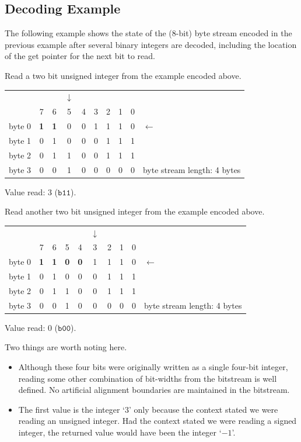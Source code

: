 \documentclass[11pt,letterpaper]{book}
\newcommand{\bin}[1]{\ensuremath{\mathtt{b#1}}}
\numberwithin{equation}{chapter}
\numberwithin{figure}{chapter}
\numberwithin{table}{chapter}
\begin{document}
\subsection{Decoding Example}

The following example shows the state of the (8-bit) byte stream encoded in the
 previous example after several binary integers are decoded, including the
 location of the get pointer for the next bit to read.

Read a two bit unsigned integer from the example encoded above.

\begin{tabular}{r|ccccccccl}
\multicolumn{1}{r}{} &&&$\downarrow$&&&&&&              \\
         & 7 & 6 & 5 & 4 & 3 & 2 & 1 & 0 &              \\\cline{1-9}
byte 0   & \textbf{1} & \textbf{1} & 0 & 0 & 1 & 1 & 1 & 0 & $\leftarrow$ \\
byte 1   & 0 & 1 & 0 & 0 & 0 & 1 & 1 & 1 &              \\
byte 2   & 0 & 1 & 1 & 0 & 0 & 1 & 1 & 1 &              \\
byte 3   & 0 & 0 & 1 & 0 & 0 & 0 & 0 & 0 &
byte stream length: 4 bytes
\end{tabular}
\vspace{\baselineskip}

Value read: 3 (\bin{11}).

Read another two bit unsigned integer from the example encoded above.

\begin{tabular}{r|ccccccccl}
\multicolumn{1}{r}{} &&&&&$\downarrow$&&&&              \\
         & 7 & 6 & 5 & 4 & 3 & 2 & 1 & 0 &              \\\cline{1-9}
byte 0   & \textbf{1} & \textbf{1} & \textbf{0} & \textbf{0} &
                           1 & 1 & 1 & 0 & $\leftarrow$ \\
byte 1   & 0 & 1 & 0 & 0 & 0 & 1 & 1 & 1 &              \\
byte 2   & 0 & 1 & 1 & 0 & 0 & 1 & 1 & 1 &              \\
byte 3   & 0 & 0 & 1 & 0 & 0 & 0 & 0 & 0 &
byte stream length: 4 bytes
\end{tabular}
\vspace{\baselineskip}

Value read: 0 (\bin{00}).

Two things are worth noting here.
\begin{itemize}
\item
Although these four bits were originally written as a single four-bit integer,
 reading some other combination of bit-widths from the bitstream is well
 defined.
No artificial alignment boundaries are maintained in the bitstream.
\item
The first value is the integer `$3$' only because the context stated we were
 reading an unsigned integer.
Had the context stated we were reading a signed integer, the returned value
 would have been the integer `$-1$'.
\end{itemize}
\end{document}
